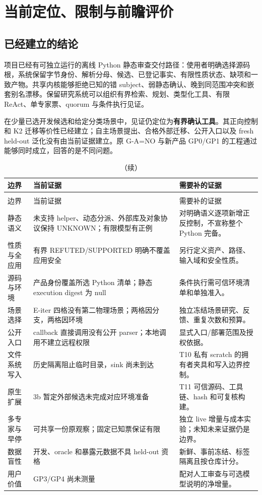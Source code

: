 \section{当前定位、限制与前瞻评价}
\label{sec:limits}
\subsection{已经建立的结论}
项目已经有可独立运行的离线 Python 静态审查交付路径：使用者明确选择源码根，系统保留字节身份、解析分母、候选、已登记事实、有限性质状态、缺项和一致产物。共享内核能够拒绝已知的错 subject、弱静态确认、晚到同范围冲突和嵌套别名漂移。保留研究系统可以组织有界检索、规划、类型化工具、有限 ReAct、单专家票、quorum 与条件执行见证。

在少量已选开发候选和给定分类场景中，见证仍定位为\textbf{有界确认工具}。其正向控制和 K2 迁移等价性已经建立；自主场景提出、合格外部迁移、公开入口以及 fresh held-out 泛化没有由当前证据建立。原 G-A=NO 与新产品 GP0/GP1 的工程通过能够同时成立，回答的是不同问题。

\begin{longtable}{L{33mm}L{70mm}L{46mm}}
\caption{当前边界、已观察影响和下一步证据要求。}\\
\toprule 边界 & 当前证据 & 需要补的证据\\\midrule\endfirsthead
\caption[]{（续）}\\
\toprule 边界 & 当前证据 & 需要补的证据\\\midrule\endhead
静态语义 & 未支持 helper、动态分派、外部库及对象协议保持 UNKNOWN；有限模型有正例 & 对明确语义逐项新增正反控制，不宣称整个 Python 完备。\\
性质与全应用 & 有界 REFUTED/SUPPORTED 明确不覆盖应用安全 & 另行定义资产、路径、输入域和安全性质。\\
源码与环境 & 产品身份覆盖所选 Python 清单；静态 execution digest 为 null & 条件执行需可信环境清单和单独准入。\\
场景选择 & E-iter 四格没有第二物理场景；两格因分支，两格因环境 & 独立冻结场景研究、反馈、重复次数和预算。\\
公开入口 & callback 直接调用没有公开 parser；本地调用不建立远程权限 & 显式入口/部署范围及授权依据。\\
文件系统写入 & 历史隔离阻止临时目录，sink 尚未到达 & T10 私有 scratch 的拥有者夹具和写入边界控制。\\
原生扩展 & 3b 暂定外部候选未完成对应环境准备 & T11 可信源码、工具链、hash 和可复核构建。\\
多专家与早停 & 可共享一份原观察；固定已知票保证有限 & 独立 live 增量与成本实验；未知未来证据仍是边界。\\
数据盲性 & 开发、oracle 和暴露元数据不具 held-out 资格 & 新鲜、事前冻结、标签隔离且按仓库计分。\\
用户价值 & GP3/GP4 尚未测量 & 配对人工审查与可选模型说明的净增量。\\
\bottomrule\end{longtable}

